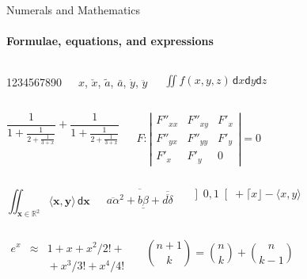 \documentclass{ELSAbeamer}
\begin{document}
\begin{frame}{Numerals and Mathematics}
\framesubtitle{Formulae, equations, and expressions}
\begin{columns}
1234567890


$\hat{x}$, $\check{x}$, $\tilde{a}$, $\bar{a}$, $\dot{y}$, $\ddot{y}$

$\iint f(x,y,z)\,\mathsf{d}x\mathsf{d}y\mathsf{d}z$
\end{columns}

\begin{columns}
\begin{equation*}
    \frac{1}{\displaystyle 1+
            \frac{1}{\displaystyle 2+
            \frac{1}{\displaystyle 3+x}}} +
            \frac{1}{1+\frac{1}{2+\frac{1}{3+x}}}
\end{equation*}

\begin{equation*}
    F:\left| \begin{array}{ccc}
          F''_{xx} & F''_{xy} &  F'_x \\
          F''_{yx} & F''_{yy} &  F'_y \\
          F'_x     & F'_y     & 0
          \end{array}\right| = 0
\end{equation*}
\end{columns}

\begin{columns}
\begin{equation*}
    \iint_{\mathbf{x} \in \mathbb{R}^2} \langle \mathbf{x},\mathbf{y}\rangle\,\mathsf{d}\mathbf{x}
\end{equation*}

\begin{equation*}
    \overline{\overline{a\alpha}^2+\underline{b\beta}
          +\overline{\overline{d\delta}}}
\end{equation*}

\begin{equation*}
    \left] 0,1\right[ + \lceil x \rfloor - \langle x,y\rangle
\end{equation*}
\end{columns}

\begin{columns}
\begin{eqnarray*}
    e^x &\approx& 1+x+x^2/2! + \\
        && {}+x^3/3! + x^4/4!
\end{eqnarray*}

\begin{equation*}
    \binom{n+1}{k} = \binom{n}{k} + \binom{n}{k-1}
\end{equation*}
\end{columns}
\end{frame}
\end{document}

